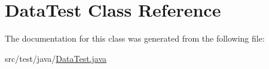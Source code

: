 \hypertarget{class_data_test}{}\section{Data\+Test Class Reference}
\label{class_data_test}


The documentation for this class was generated from the following file\+:\begin{DoxyCompactItemize}
\item 
src/test/java/\mbox{\hyperlink{_data_test_8java}{Data\+Test.\+java}}\end{DoxyCompactItemize}
